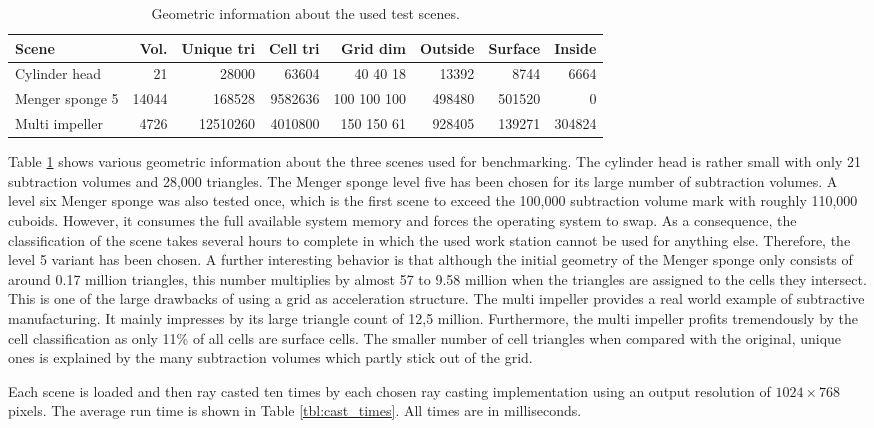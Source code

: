 \begin{table}[h]
	\centering
	\begin{tabular}{|l | r r r r r r r|}
		\hline
		Scene & Vol. & Unique tri & Cell tri & Grid dim & Outside & Surface & Inside \\
		\hline
		Cylinder head & 21 & 28000 & 63604 & 40 40 18 & 13392 & 8744 & 6664 \\
		Menger sponge 5 & 14044 & 168528 & 9582636 & 100 100 100 & 498480 & 501520 & 0 \\
		Multi impeller & 4726 & 12510260 & 4010800 & 150 150 61 & 928405 & 139271 & 304824 \\
		\hline
	\end{tabular}
	\caption{Geometric information about the used test scenes.}
	\label{tbl:geometrics}
\end{table}

Table \ref{tbl:geometrics} shows various geometric information about the three scenes used for benchmarking. The cylinder head is rather small with only 21 subtraction volumes and 28,000 triangles. The Menger sponge level five has been chosen for its large number of subtraction volumes. A level six Menger sponge was also tested once, which is the first scene to exceed the 100,000 subtraction volume mark with roughly 110,000 cuboids. However, it consumes the full available system memory and forces the operating system to swap. As a consequence, the classification of the scene takes several hours to complete in which the used work station cannot be used for anything else. Therefore, the level 5 variant has been chosen. A further interesting behavior is that although the initial geometry of the Menger sponge only consists of around 0.17 million triangles, this number multiplies by almost 57 to 9.58 million when the triangles are assigned to the cells they intersect. This is one of the large drawbacks of using a grid as acceleration structure. The multi impeller provides a real world example of subtractive manufacturing. It mainly impresses by its large triangle count of 12,5 million. Furthermore, the multi impeller profits tremendously by the cell classification as only 11\% of all cells are surface cells. The smaller number of cell triangles when compared with the original, unique ones is explained by the many subtraction volumes which partly stick out of the grid.

Each scene is loaded and then ray casted ten times by each chosen ray casting implementation using an output resolution of $1024 \times 768$ pixels. The average run time is shown in Table \ref{tbl:cast_times}. All times are in milliseconds.

